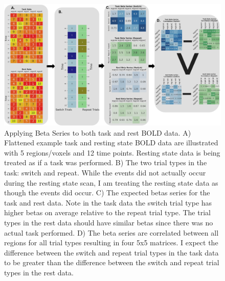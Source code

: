 \documentclass[phd,appendix,figures]{uithesis}
\begin{document}
\begin{figure}[H]%
	\centering
	\includegraphics[width=1\linewidth]{validation_of_beta_series_pt_1}
	\caption{Applying Beta Series to both task and rest BOLD data.
	A) Flattened example task and resting state BOLD data are illustrated with 5 regions/voxels and 12 time points.
	Resting state data is being treated as if a task was performed.
	B) The two trial types in the task: switch and repeat. While the events did not actually occur during the resting state scan,
	I am treating the resting state data as though the events did occur.
	C) The expected betas series for the task and rest data.
	Note in the task data the switch trial type has higher betas on average relative to the repeat trial type.
	The trial types in the rest data should have similar betas since there was no actual task performed.
	D) The beta series are correlated between all regions for all trial types resulting in four 5x5 matrices.
	I expect the difference between the switch and repeat trial types in the task data to be greater than
	the difference between the switch and repeat trial types in the rest data.}
	\label{fig:validation_of_beta_series_pt_1}
\end{figure}
\end{document}
